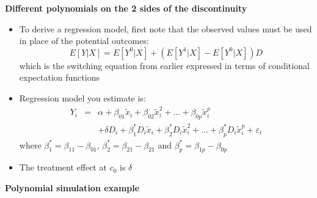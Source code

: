 \documentclass[notes=show]{beamer}
\begin{document}
\begin{frame}[plain]
	\begin{center}
	\textbf{Different polynomials on the 2 sides of the discontinuity}
	\end{center}
	
	\begin{itemize}
	\item To derive a regression model, first note that the observed values must be used in place of the potential outcomes:$$E[Y | X] = E[Y^0 | X] + \left (E[Y^1 | X] - E[Y^0 | X] \right)D$$which is the switching equation from earlier expressed in terms of conditional expectation functions
	\item Regression model you estimate is:
		\begin{eqnarray*}
		Y_i &=& \alpha + \beta_{01}\tilde{x}_i + \beta_{02}\tilde{x}_i^2 + \dots + \beta_{0p}\tilde{x}_i^p \\
		& & + \delta{D}_i + \beta_1^*D_i\tilde{x}_i + \beta_2^*D_i\tilde{x}_i^2 + \dots + \beta_p^*D_i\tilde{x}_i^p + \varepsilon_i 
		\end{eqnarray*}where $\beta^*_1 = \beta_{11} - \beta_{01}$, $\beta_2^* = \beta_{21} - \beta_{21}$ and $\beta_p^*=\beta_{1p}-\beta_{0p}$
	\item The treatment effect at $c_0$ is $\delta$
	\end{itemize}
\end{frame}


\begin{frame}[plain]
	\begin{center}
	\textbf{Polynomial simulation example}
	\end{center}

 
	
\end{frame}
\end{document}
